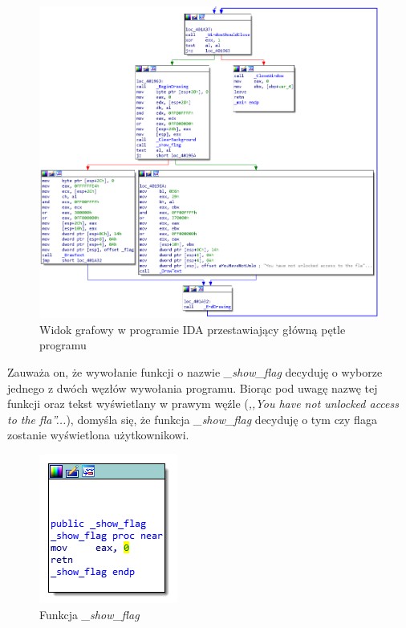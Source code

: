 \documentclass[polish,12pt]{aghthesis}
\begin{document}
\begin{figure}[H]
    \centering
    \includegraphics[width=16cm]{200_ida_graph}
    \caption{Widok grafowy w programie IDA przestawiający główną pętle programu}
    \label{fig:200_ida_graph}
\end{figure}

Zauważa on, że wywołanie funkcji o nazwie \emph{\_show\_flag} decyduję o wyborze jednego
z dwóch węzłów wywołania programu. Biorąc pod uwagę nazwę tej funkcji oraz tekst
wyświetlany w prawym węźle (\textit{,,You have not unlocked access to the fla''...}), domyśla
się, że funkcja \emph{\_show\_flag} decyduję o tym czy flaga zostanie wyświetlona użytkownikowi.

\begin{figure}[H]
    \centering
    \includegraphics{200_ida_show_flag}
    \caption{Funkcja \emph{\_show\_flag}}
    \label{fig:200_ida_show_flag}
\end{figure}
\end{document}
